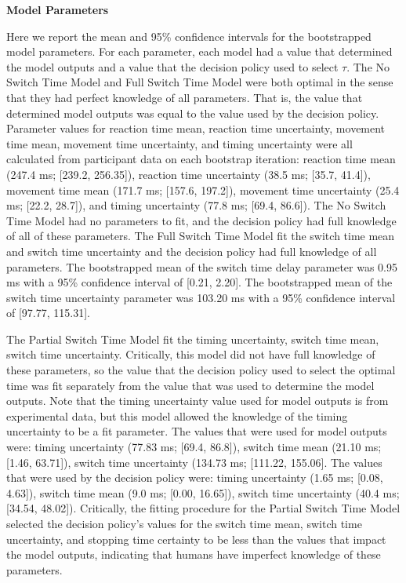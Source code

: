 \documentclass[12pt,letterpaper]{article}
\begin{document}
\noindent \textbf{Model Parameters}

\noindent Here we report the mean and 95\% confidence intervals for the bootstrapped model parameters. For each parameter, each model had a value that determined the model outputs and a value that the decision policy used to select $\tau$. The No Switch Time Model and Full Switch Time Model were both optimal in the sense that they had perfect knowledge of all parameters. That is, the value that determined model outputs was equal to the value used by the decision policy. Parameter values for reaction time mean, reaction time uncertainty, movement time mean, movement time uncertainty, and timing uncertainty were all calculated from participant data on each bootstrap iteration: reaction time mean (247.4 ms; [239.2, 256.35]), reaction time uncertainty (38.5 ms; [35.7, 41.4]), movement time mean (171.7 ms; [157.6, 197.2]), movement time uncertainty (25.4 ms; [22.2, 28.7]), and timing uncertainty (77.8 ms; [69.4, 86.6]). The No Switch Time Model had no parameters to fit, and the decision policy had full knowledge of all of these parameters. The Full Switch Time Model fit the switch time mean and switch time uncertainty and the decision policy had full knowledge of all parameters. The bootstrapped mean of the switch time delay parameter was 0.95 ms with a 95\% confidence interval of [0.21, 2.20]. The bootstrapped mean of the switch time uncertainty parameter was 103.20 ms with a 95\% confidence interval of [97.77, 115.31].

The Partial Switch Time Model fit the timing uncertainty, switch time mean, switch time uncertainty. Critically, this model did not have full knowledge of these parameters, so the value that the decision policy used to select the optimal time was fit separately from the value that was used to determine the model outputs. Note that the timing uncertainty value used for model outputs is from experimental data, but this model allowed the knowledge of the timing uncertainty to be a fit parameter. The values that were used for model outputs were: timing uncertainty (77.83 ms; [69.4, 86.8]), switch time mean (21.10 ms; [1.46, 63.71]), switch time uncertainty (134.73 ms; [111.22, 155.06]. The values that were used by the decision policy were: timing uncertainty (1.65 ms;  [0.08, 4.63]), switch time mean (9.0 ms; [0.00, 16.65]), switch time uncertainty (40.4 ms; [34.54, 48.02]). Critically, the fitting procedure for the Partial Switch Time Model selected the decision policy’s values for the switch time mean, switch time uncertainty, and stopping time certainty to be less than the values that impact the model outputs, indicating that  humans have imperfect knowledge of these parameters.
\end{document}
